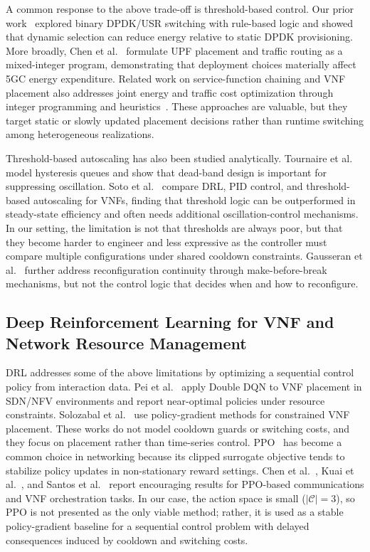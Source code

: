 \documentclass[a4paper,fleqn]{cas-sc}
\begin{document}
A common response to the above trade-off is threshold-based control. Our prior work~\cite{BorjiDynamicEU} explored binary DPDK/USR switching with rule-based logic and showed that dynamic selection can reduce energy relative to static DPDK provisioning. More broadly, Chen et al.~\cite{chen2024comcom} formulate UPF placement and traffic routing as a mixed-integer program, demonstrating that deployment choices materially affect 5GC energy expenditure. Related work on service-function chaining and VNF placement also addresses joint energy and traffic cost optimization through integer programming and heuristics~\cite{pham2020tsc,lin2023tsc}. These approaches are valuable, but they target static or slowly updated placement decisions rather than runtime switching among heterogeneous realizations.

Threshold-based autoscaling has also been studied analytically. Tournaire et al.~\cite{tournaire2019mascots} model hysteresis queues and show that dead-band design is important for suppressing oscillation. Soto et al.~\cite{soto2021sds} compare DRL, PID control, and threshold-based autoscaling for VNFs, finding that threshold logic can be outperformed in steady-state efficiency and often needs additional oscillation-control mechanisms. In our setting, the limitation is not that thresholds are always poor, but that they become harder to engineer and less expressive as the controller must compare multiple configurations under shared cooldown constraints. Gausseran et al.~\cite{gausseran2020icc} further address reconfiguration continuity through make-before-break mechanisms, but not the control logic that decides when and how to reconfigure.

\subsection{Deep Reinforcement Learning for VNF and Network Resource Management}
\label{subsec:rel_drl}

DRL addresses some of the above limitations by optimizing a sequential control policy from interaction data. Pei et al.~\cite{pei2020jsac} apply Double DQN to VNF placement in SDN/NFV environments and report near-optimal policies under resource constraints. Solozabal et al.~\cite{solozabal2020jsac} use policy-gradient methods for constrained VNF placement. These works do not model cooldown guards or switching costs, and they focus on placement rather than time-series control. PPO~\cite{schulman2017ppo} has become a common choice in networking because its clipped surrogate objective tends to stabilize policy updates in non-stationary reward settings. Chen et al.~\cite{chen2022tcomm}, Kuai et al.~\cite{kuai2022tcomm}, and Santos et al.~\cite{santos2022fgcs} report encouraging results for PPO-based communications and VNF orchestration tasks. In our case, the action space is small ($|\mathcal{C}|=3$), so PPO is not presented as the only viable method; rather, it is used as a stable policy-gradient baseline for a sequential control problem with delayed consequences induced by cooldown and switching costs.
\end{document}
